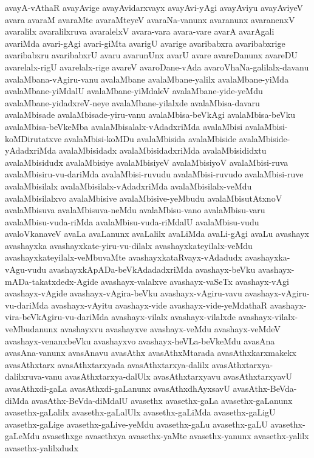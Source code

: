 {avayA-vAthaR
avayAvige
avayAvidarxvayx
avayAvi-yAgi
avayAviyu
avayAviyeV
avara
avaraM
avaraMte
avaraMteyeV
avaraNa-vanunx
avaranunx
avaranenxV
avaralilx
avaralilxruva
avaralelxV
avara-vara
avara-vare
avarA
avarAgali
avariMda
avari-gAgi
avari-giMta
avarigU
avarige
avaribabxra
avaribabxrige
avaribabxru
avaribabxrU
avaru
avarunUnx
avarU
avare
avareDanunx
avareDU
avarelalx-rigU
avarelalx-rige
avareV
avaroDane-vAda
avaroVhaNa-galilalx-davanu
avalaMbana-vAgiru-vanu
avalaMbane
avalaMbane-yalilx
avalaMbane-yiMda
avalaMbane-yiMdalU
avalaMbane-yiMdaleV
avalaMbane-yide-yeMdu
avalaMbane-yidadxreV-neye
avalaMbane-yilalxde
avalaMbisa-davaru
avalaMbisade
avalaMbisade-yiru-vanu
avalaMbisa-beVkAgi
avalaMbisa-beVku
avalaMbisa-beVkeMba
avalaMbisalalx-vAdadxriMda
avalaMbisi
avalaMbisi-koMDirutatxve
avalaMbisi-koMDu
avalaMbisida
avalaMbiside
avalaMbiside-yAdadxriMda
avalaMbisidadx
avalaMbisidadxriMda
avalaMbisididxtu
avalaMbisidudx
avalaMbisiye
avalaMbisiyeV
avalaMbisiyoV
avalaMbisi-ruva
avalaMbisiru-vu-dariMda
avalaMbisi-ruvudu
avalaMbisi-ruvudo
avalaMbisi-ruve
avalaMbisilalx
avalaMbisilalx-vAdadxriMda
avalaMbisilalx-veMdu
avalaMbisilalxvo
avalaMbisive
avalaMbisive-yeMbudu
avalaMbisutAtxnoV
avalaMbisuva
avalaMbisuva-neMdu
avalaMbisu-vano
avalaMbisu-varu
avalaMbisu-vuda-riMda
avalaMbisu-vuda-riMdalU
avalaMbisu-vudu
avaloVkanaveV
avaLa
avaLanunx
avaLalilx
avaLiMda
avaLi-gAgi
avaLu
avashayx
avashayxka
avashayxkate-yiru-vu-dilalx
avashayxkateyilalx-veMdu
avashayxkateyilalx-veMbuvaMte
avashayxkataRvayx-vAdadudx
avashayxka-vAgu-vudu
avashayxkApADa-beVkAdadadxriMda
avashayx-beVku
avashayx-mADa-takatxdedx-Agide
avashayx-valalxve
avashayx-vaSeTx
avashayx-vAgi
avashayx-vAgide
avashayx-vAgira-beVku
avashayx-vAgiru-vavu
avashayx-vAgiru-vu-dariMda
avashayx-vAyitu
avashayx-vide
avashayx-vide-yeMdathaR
avashayx-vira-beVkAgiru-vu-dariMda
avashayx-vilalx
avashayx-vilalxde
avashayx-vilalx-veMbudanunx
avashayxvu
avashayxve
avashayx-veMdu
avashayx-veMdeV
avashayx-venanxbeVku
avashayxvo
avashayx-heVLa-beVkeMdu
avasAna
avasAna-vanunx
avasAnavu
avasAthx
avasAthxMtarada
avasAthxkarxmakekx
avasAthxtarx
avasAthxtarxyada
avasAthxtarxya-dalilx
avasAthxtarxya-dalilxruva-vanu
avasAthxtarxya-dalUlx
avasAthxtarxyavu
avasAthxtarxyavU
avasAthxdi-gaLa
avasAthxdi-gaLanunx
avasAthxdhAyxsavU
avasAthx-BeVda-diMda
avasAthx-BeVda-diMdalU
avasethx
avasethx-gaLa
avasethx-gaLanunx
avasethx-gaLalilx
avasethx-gaLalUlx
avasethx-gaLiMda
avasethx-gaLigU
avasethx-gaLige
avasethx-gaLive-yeMdu
avasethx-gaLu
avasethx-gaLU
avasethx-gaLeMdu
avasethxge
avasethxya
avasethx-yaMte
avasethx-yanunx
avasethx-yalilx
avasethx-yalilxdudx
}
